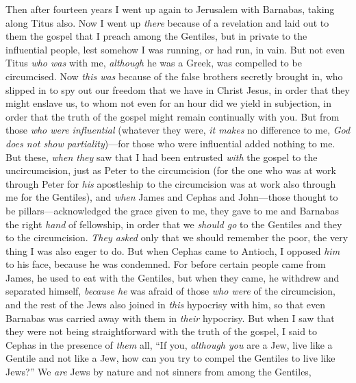 \begin{biblechapter} %
 Then after fourteen years I went up again to Jerusalem with Barnabas, taking along Titus also.
\verse Now I went up \textit{there} because of a revelation and laid out to them the gospel that I preach among the Gentiles, but in private to the influential people, lest somehow I was running, or had run, in vain.
\verse But not even Titus \textit{who was} with me, \textit{although} he was a Greek, was compelled to be circumcised.
\verse Now \textit{this was} because of the false brothers secretly brought in, who slipped in to spy out our freedom that we have in Christ Jesus, in order that they might enslave us,
\verse to whom not even for an hour did we yield in subjection, in order that the truth of the gospel might remain continually with you.
\verse But from those \textit{who were influential} (whatever they were, \textit{it makes} no difference to me, \textit{God does not show partiality})—for those who were influential added nothing to me.
\verse But these, \textit{when they} saw that I had been entrusted \textit{with} the gospel to the uncircumcision, just as Peter to the circumcision
\verse (for the one who was at work through Peter for \textit{his} apostleship to the circumcision was at work also through me for the Gentiles),
\verse and \textit{when} James and Cephas and John—those thought to be pillars—acknowledged the grace given to me, they gave to me and Barnabas the right \textit{hand} of fellowship, in order that we \textit{should go} to the Gentiles and they to the circumcision.
\verse \textit{They asked} only that we should remember the poor, the very thing I was also eager to do.
 But when Cephas came to Antioch, I opposed \textit{him} to his face, because he was condemned.
\verse For before certain people came from James, he used to eat with the Gentiles, but when they came, he withdrew and separated himself, \textit{because he} was afraid of those \textit{who were} of the circumcision,
\verse and the rest of the Jews also joined in \textit{this} hypocrisy with him, so that even Barnabas was carried away with them in \textit{their} hypocrisy.
\verse But when I saw that they were not being straightforward with the truth of the gospel, I said to Cephas in the presence of \textit{them} all, “If you, \textit{although you} are a Jew, live like a Gentile and not like a Jew, how can you try to compel the Gentiles to live like Jews?”
 We \textit{are} Jews by nature and not sinners from among the Gentiles,

\end{biblechapter}
